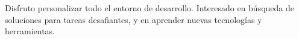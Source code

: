 
\begin{cvparagraph}

Disfruto personalizar todo el entorno de desarrollo. Interesado en búsqueda de soluciones para tareas desafiantes, y en aprender nuevas tecnologías y herramientas.
\end{cvparagraph}
